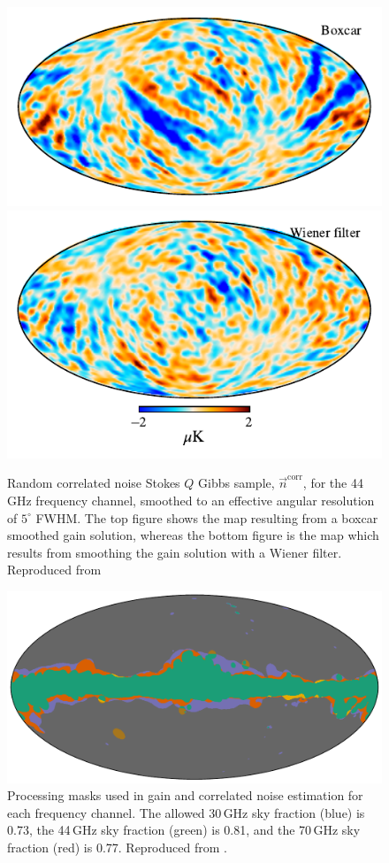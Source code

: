 \documentclass[onecolumn]{aa}
\newcommand{\n}[0]{\vec{n}}
\begin{document}
\begin{figure}[t]
  \center
  \includegraphics[width=0.5\linewidth]{figs/ncorr_Q_5deg_boxcar.pdf}\\\vspace*{-3mm}
  \includegraphics[width=0.5\linewidth]{figs/ncorr_Q_5deg_wiener.pdf}
  \caption{Random correlated noise Stokes $Q$ Gibbs sample,
    $\n^{\mathrm{corr}}$, for the 44\,GHz frequency channel, smoothed
    to an effective angular resolution of $5^{\circ}$ FWHM. The top
    figure shows the map resulting from a boxcar smoothed gain solution,
    whereas the bottom figure is the map which results from smoothing
    the gain solution with a Wiener filter. Reproduced from \citet{bp07}  }\label{fig:corrstripes}
\end{figure}

\begin{figure}[t]
  \center
  \includegraphics[width=0.5\linewidth]{figs/mask_proc_BP8_v1.pdf}
  \caption{Processing masks used in gain and correlated noise
    estimation for each frequency channel. The allowed 30\,GHz sky
    fraction (blue) is 0.73, the 44\,GHz sky fraction (green) is 0.81,
    and the 70\,GHz sky fraction (red) is 0.77. Reproduced from
    \citet{bp07}.}
  \label{fig:procmask}
\end{figure}
\end{document}
